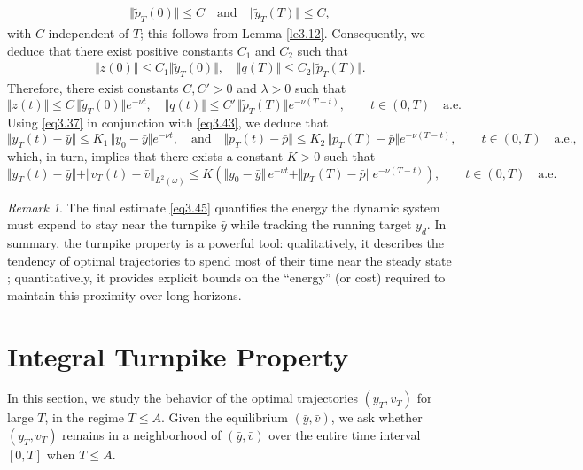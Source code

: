 \documentclass[10pt, a4]{amsart}
\makeatletter
\theoremstyle{plain}
\theoremstyle{definition}
\theoremstyle{remark}
\newtheorem{remark}[lemma]{Remark}
\renewenvironment{proof}[1][\proofname]{\par
  \pushQED{\qed}%
  \normalfont \topsep6\p@\@plus6\p@\relax
  \trivlist
  \item[\hskip\labelsep
        \itshape
    #1\ \ref{#1}.]\ignorespaces
}{%
  \popQED\endtrivlist\@endpefalse
}
\numberwithin{equation}{section}
\makeatother
\begin{document}
\begin{proof}[of Theorem \ref{th1.5}]
\begin{align}
    \Vert \tilde{p}_T(0)\Vert\leq C \quad \text{and} \quad \Vert\tilde{y}_T(T)\Vert\leq C,
\end{align}
with \(C\) independent of \(T\); this follows from Lemma \ref{le3.12}. Consequently, we deduce that there exist positive constants \(C_1\) and \(C_2\) such that
\begin{align}
    \Vert z(0)\Vert\leq C_1\Vert \tilde{y}_T(0)\Vert,\quad  \Vert q(T)\Vert\leq C_2\Vert \tilde{p}_T(T)\Vert.
\end{align}
Therefore, there exist constants \(C, C'>0\) and \(\lambda>0\) such that
\begin{equation}\label{eq3.43}
\Vert z(t)\Vert\leq C\, \Vert \tilde{y}_T(0)\Vert e^{-\nu t},\quad  \Vert q(t)\Vert\leq C'\, \Vert \tilde{p}_T(T)\Vert e^{-\nu(T-t)},\qquad t\in (0,T)\quad \text{a.e.}
\end{equation}
Using \eqref{eq3.37} in conjunction with \eqref{eq3.43}, we deduce that
\begin{equation}\label{eq3.44}
\Vert y_T(t)-\bar{y}\Vert \leq K_1\, \Vert y_0-\bar{y}\Vert e^{-\nu t},\quad\text{and}\quad \Vert p_T(t)-\bar{p}\Vert \leq K_2\, \Vert p_T(T)-\bar{p}\Vert e^{-\nu (T-t)},\qquad t\in (0,T)\quad \text{a.e.},
\end{equation}
which, in turn, implies that there exists a constant \(K>0\) such that
\begin{equation}\label{eq3.45}
\Vert y_T(t)-\bar{y}\Vert + \Vert v_T(t)-\bar{v}\Vert_{L^2(\omega)} \leq K\left( \Vert y_0-\bar{y}\Vert\, e^{-\nu t} + \Vert p_T(T)-\bar{p}\Vert\, e^{-\nu (T-t)} \right),\qquad t\in (0,T)\quad \text{a.e.}
\end{equation}
\end{proof}

\begin{remark}
 The final estimate \eqref{eq3.45} quantifies the energy the dynamic system must expend to stay near the turnpike $\bar{y}$ while tracking the running target $y_d$. In summary, the turnpike property is a powerful tool: qualitatively, it describes the tendency of optimal trajectories to spend most of their time near the steady state ; quantitatively, it provides explicit bounds on the “energy” (or cost) required to maintain this proximity over long horizons.
\end{remark}
\section{Integral Turnpike Property}\label{s6}
 In this section, we study the behavior of the optimal trajectories $(y_T,v_T)$ for large $T$, in the regime $T\le A$.  Given the equilibrium $(\bar y,\bar v)$, we ask whether $(y_T,v_T)$ remains in a neighborhood of $(\bar y,\bar v)$ over the entire time interval $[0,T]$ when $T\le A$. 
\end{document}
